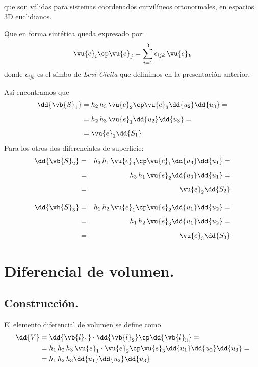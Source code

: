 que son válidas para sistemas coordenados curvilíneos ortonormales, en espacios 3D euclidianos.
\par
Que en forma sintética queda expresado por:
\begin{align}
\vu{e}_{i} \cp \vu{e}_{j} = \sum_{i=1}^{3} \epsilon_{ijk} \, \vu{e}_{k}
\end{align}
donde $\epsilon_{ijk}$ es el símbo de \emph{Levi-Civita} que definimos en la presentación anterior.
\par
Así encontramos que
\begin{align*}
\dd{\vb{S}_{1}} &= h_{2} \, h_{3} \, \vu{e}_{2} \cp \vu{e}_{3} \dd{u_{2}} \dd{u_{3}} = \\[0.5em]
&= h_{2} \, h_{3} \, \vu{e}_{1} \dd{u_{2}} \dd{u_{3}} = \\[0.5em]
&= \vu{e}_{1} \dd{S_{1}}
\end{align*}
Para los otros dos diferenciales de superficie:
\fontsize{12}{12}\selectfont
\begin{eqnarray*}
\dd{\vb{S}_{2}} &=& h_{3} \, h_{1} \, \vu{e}_{3} \cp \vu{e}_{1} \dd{u_{3}} \dd{u_{1}} = \\[0.5em]
&=& h_{3} \, h_{1} \, \vu{e}_{2} \dd{u_{3}} \dd{u_{1}} = \\[0.5em]
&=& \vu{e}_{2} \dd{S_{2}} \\[1em]
\dd{\vb{S}_{3}} &=& h_{1} \, h_{2} \, \vu{e}_{1} \cp \vu{e}_{2} \dd{u_{1}} \dd{u_{2}} = \\[0.5em]
&=& h_{1} \, h_{2} \, \vu{e}_{3} \dd{u_{1}} \dd{u_{2}} = \\[0.5em]
&=& \vu{e}_{3} \dd{S_{3}}
\end{eqnarray*}
\section{Diferencial de volumen.}
\subsection{Construcción.}
El elemento diferencial de volumen se define como
\begin{align*}
\dd{V} &= \dd{\vb{l}_{1}} \cdot \dd{\vb{l}_{2}} \cp \dd{\vb{l}_{3}} = \\
&= h_{1} \, h_{2} \, h_{3} \, \vu{e}_{1} \cdot \vu{e}_{2} \cp \vu{e}_{3} \dd{u_{1}} \dd{u_{2}} \dd{u_{3}} = \\
&= h_{1} \, h_{2} \, h_{3} \dd{u_{1}} \dd{u_{2}} \dd{u_{3}}
\end{align*}
